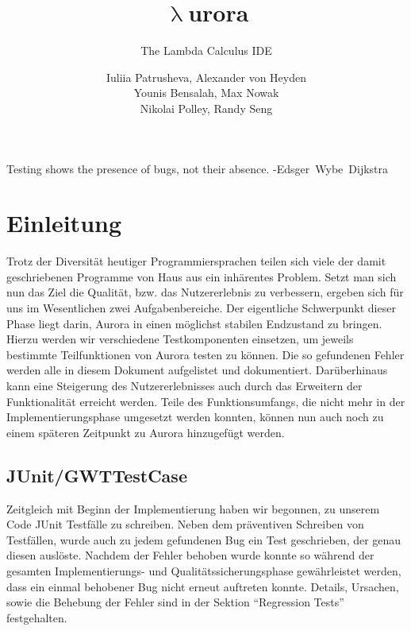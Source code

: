 \documentclass[parskip=full,11pt,twoside]{scrartcl}
\title{\textbf{$\uplambda$}urora}
\subtitle{The Lambda Calculus IDE}
\author{Iuliia Patrusheva, Alexander von Heyden\\
    Younis Bensalah, Max Nowak\\
    Nikolai Polley, Randy Seng}
\newcommand{\signed}[1]{%
   \unskip\hspace*{1em plus 1fill}%
   \nolinebreak[3]\hspace*{\fill}\mbox{\upshape #1}
}
\newenvironment{xquote}{%
   \begin{list}{}{%
     \rightmargin
     \leftmargin
   }
   \itshape
   \item[]
}
{\end{list}}
\begin{document}
\maketitle
\tableofcontents
\newpage

\begin{xquote}
    Testing shows the presence of bugs, not their absence.
    \newline
    \signed{-Edsger Wybe Dijkstra}
\end{xquote}

\section{Einleitung}
Trotz der Diversität heutiger Programmiersprachen teilen sich viele der damit geschriebenen Programme von Haus aus ein inhärentes Problem.
Setzt man sich nun das Ziel die Qualität, bzw. das Nutzererlebnis zu verbessern, ergeben sich für uns im Wesentlichen zwei Aufgabenbereiche.
\newline
Der eigentliche Schwerpunkt dieser Phase liegt darin, Aurora in einen möglichst stabilen Endzustand zu bringen.
Hierzu werden wir verschiedene Testkomponenten einsetzen, um jeweils bestimmte Teilfunktionen von Aurora testen zu können.
Die so gefundenen Fehler werden alle in diesem Dokument aufgelistet und dokumentiert.
\newline
Darüberhinaus kann eine Steigerung des Nutzererlebnisses auch durch das Erweitern der Funktionalität erreicht werden.
Teile des Funktionsumfangs, die nicht mehr in der Implementierungsphase umgesetzt werden konnten, können nun auch noch zu einem späteren Zeitpunkt zu Aurora hinzugefügt werden.

\subsection{JUnit/GWTTestCase}
Zeitgleich mit Beginn der Implementierung haben wir begonnen, zu unserem Code JUnit Testfälle zu schreiben.
Neben dem präventiven Schreiben von Testfällen, wurde auch zu jedem gefundenen Bug ein Test geschrieben, der genau diesen auslöste.
Nachdem der Fehler behoben wurde konnte so während der gesamten Implementierungs- und Qualitätssicherungsphase gewährleistet werden, dass ein einmal behobener Bug nicht erneut auftreten konnte.
Details, Ursachen, sowie die Behebung der Fehler sind in der Sektion \enquote{Regression Tests} festgehalten.
\end{document}
